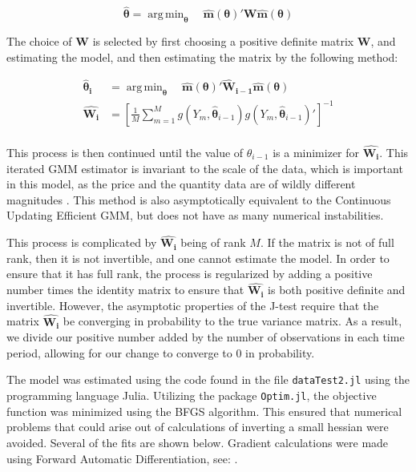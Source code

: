 \documentclass[12pt, letterpaper]{paper}
\DeclareMathOperator*{\argmin}{arg\,min}
\begin{document}
\begin{equation*}
\bm{\hat{\theta}} = \argmin_{\bm{\theta}} \quad \bm{\hat{m}}( \bm{\theta} )' \bm{W} \bm{\hat{m}}( \bm{\theta} )
\end{equation*}

The choice of $\bm{W}$ is selected by first choosing a positive definite
matrix $\bm{W}$, and estimating the model, and then estimating the matrix by
the following method:

\begin{align*}
\bm{\hat{\theta}_i} &= \argmin_{\bm{\theta}} \quad \bm{\hat{m}}( \bm{\theta} )' \bm{\widehat{W}_{i-1}} \bm{\hat{m}}( \bm{\theta} ) \\
\bm{\widehat{W_i}} &= \left [ \frac{1}{M} \sum_{m=1}^M g(Y_m, \hat{\bm{\theta}}_{i-1} ) g( Y_m,\hat{\bm{\theta}}_{i-1}  )' \right ]^{-1} \\
\end{align*}

This process is then continued until the value of $\theta_{i-1}$ is a
minimizer for $\bm{\widehat{W_i}}$. This iterated GMM estimator is invariant to the
scale of the data, which is important in this model, as the price and
the quantity data are of wildly different magnitudes \cite{hall2005generalized}. This method is also asymptotically equivalent to the
Continuous Updating Efficient GMM, but does not have as many numerical
instabilities.

This process is complicated by $\bm{\widehat{W_i}}$ being of rank
$M$. If the matrix is not of full rank, then it is not invertible, and
one cannot estimate the model. In order to ensure that it has full
rank, the process is regularized by adding a positive number times the
identity matrix to ensure that $\bm{\widehat{W_i}}$ is both positive definite
and invertible. However, the asymptotic properties of the J-test
require that the matrix $\bm{\widehat{W_i}}$ be converging in probability to the
true variance matrix. As a result, we divide our positive number added
by the number of observations in each time period, allowing for our
change to converge to 0 in probability.


The model was estimated using the code found in the file
\texttt{dataTest2.jl} using the programming language Julia. Utilizing the
package \texttt{Optim.jl}, the objective function was minimized using the
BFGS algorithm. This ensured that numerical problems that could arise
out of calculations of inverting a small hessian were avoided. Several
of the fits are shown below. Gradient calculations were made using
Forward Automatic Differentiation, see: \citet*{ForwardDiff}.
\end{document}
